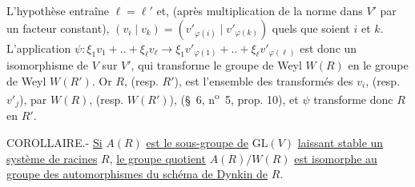 L'hypothèse entraîne $\ell=\ell'$ et, (après multiplication de la norme dans $V'$ par un facteur constant), $(v_i\mid v_k)=(v'_{\varphi(i)}\mid v'_{\varphi(k)})$ quels que soient $i$ et $k$. L'application $\psi:\xi_1v_1+..+\xi_\ell v_\ell\longrightarrow\xi_1v'_{\varphi(1)}+..+\xi_\ell v'_{\varphi(\ell)}$ est donc un isomorphisme de $V$ sur $V'$, qui transforme le groupe de Weyl $W(R)$ en le groupe de Weyl $W(R')$. Or $R$, (resp. $R'$), est l'ensemble des transformés des $v_i$, (resp. $v'_j$), par $W(R)$, (resp. $W(R')$), (\S~6, n\textsuperscript{o}~5, prop. 10), et $\psi$ transforme donc $R$ en $R'$.

COROLLAIRE.- \uline{Si} $A(R)$ \uline{est le sous-groupe de} $\mathrm{GL}(V)$ \uline{laissant stable un système de racines} $R$, \uline{le groupe quotient} $A(R)/W(R)$ \uline{est isomorphe au groupe des automorphismes du schéma de Dynkin de} $R$.

